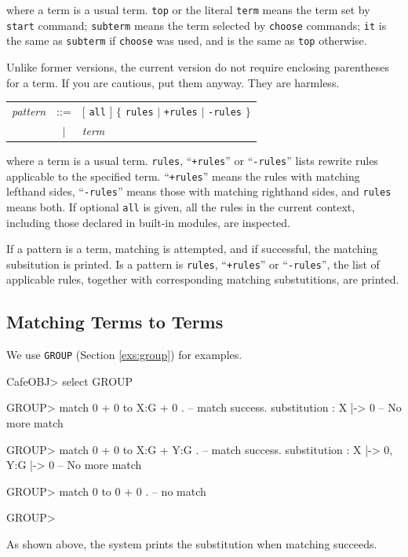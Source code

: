 \documentclass[a4paper]{memoir}
\begin{document}
where a term is a usual term. \verb|top| or the literal \verb|term|
means the term set by
\verb|start| command; \verb|subterm| means the term selected by \verb|choose|
commands; \verb|it| is the same as \verb|subterm| if \verb|choose| was
used, and is the same as \verb|top| otherwise.

\begin{warning}
  Unlike former versions, the current version do not require enclosing
  parentheses for a term. If you are cautious, put them anyway. They
  are harmless.
\end{warning}

\begin{tabular}{r c l}\index{\texttt{all}}\index{\texttt{rules}}\index{\texttt{+rules}}
\index{\texttt{-rules}}
  \textit{pattern} &::=& $[$ \verb|all| $]$
   $\{$ \verb|rules| $|$ \verb|+rules| $|$ \verb|-rules| $\}$ \\
   &$|$& \textit{term}
\end{tabular}

where a term is a usual term. \verb|rules|, ``\verb|+rules|'' or
``\verb|-rules|''
lists rewrite rules applicable to the specified term. ``\verb|+rules|'' means
the rules with matching lefthand sides, ``\verb|-rules|'' means
those with
matching righthand sides, and \verb|rules| means both.
If optional \verb|all| is given, all the rules in the current context,
including those declared in built-in modules, are inspected.

If a pattern is a term, matching is attempted, and if successful,
the matching subsitution is printed. Is a pattern is \verb|rules|,
``\verb|+rules|'' or ``\verb|-rules|'',
the list of applicable rules, together with
corresponding matching substutitions, are printed.

\subsection{Matching Terms to Terms}\label{sec:p2-match-to-term}

We use \verb|GROUP| (Section \ref{exs:group}) for examples.
\begin{vvtm}
\begin{ccode}
  CafeOBJ> select GROUP

  GROUP> match 0 + 0 to X:G + 0 .
  -- match success.
   substitution : { X |-> 0 }
  -- No more match

  GROUP> match 0 + 0 to X:G + Y:G .
  -- match success.
   substitution : { X |-> 0, Y:G |-> 0 }
  -- No more match

  GROUP> match 0 to 0 + 0 .
  -- no match

  GROUP> 
\end{ccode}
\end{vvtm} 
As shown above, the system prints the substitution when
matching succeeds.
\end{document}
